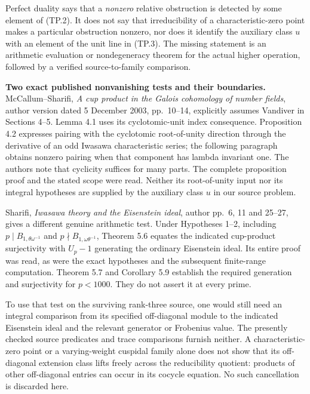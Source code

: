 \documentclass[11pt,a4paper]{article}
\theoremstyle{definition}
\renewcommand{\paragraph}[1]{\par\smallskip\noindent\textbf{#1}\quad\ignorespaces}
\begin{document}
Perfect duality says that a \emph{nonzero} relative
obstruction is detected by some element of (TP.2).
It does not say that irreducibility of a characteristic-zero
point makes a particular obstruction nonzero, nor does it
identify the auxiliary class \(u\) with an element of
the unit line in (TP.3).  The missing statement is an
arithmetic evaluation or nondegeneracy theorem for the
actual higher operation, followed by a verified
source-to-family comparison.

\paragraph{Two exact published nonvanishing tests and their boundaries.}
McCallum--Sharifi, \emph{A cup product in the Galois
cohomology of number fields}, author version dated
5 December 2003, pp.~10--14, explicitly assumes
Vandiver in Sections 4--5.  Lemma 4.1 uses its
cyclotomic-unit index consequence.  Proposition 4.2
expresses pairing with the cyclotomic root-of-unity
direction through the derivative of an odd Iwasawa
characteristic series; the following paragraph obtains
nonzero pairing when that component has lambda
invariant one.  The authors note that cyclicity suffices
for many parts.  The complete proposition proof and
the stated scope were read.  Neither its root-of-unity
input nor its integral hypotheses are supplied by
the auxiliary class \(u\) in our source problem.

Sharifi, \emph{Iwasawa theory and the Eisenstein ideal},
author pp.~6, 11 and 25--27, gives a different genuine
arithmetic test.  Under Hypotheses 1--2, including
\(p\mid B_{1,\theta\omega^{-1}}\) and
\(p\nmid B_{1,\omega\theta^{-1}}\), Theorem 5.6
equates the indicated cup-product surjectivity with
\(U_p-1\) generating the ordinary Eisenstein ideal.
Its entire proof was read, as were the exact
hypotheses and the subsequent finite-range computation.
Theorem 5.7 and Corollary 5.9 establish the required
generation and surjectivity for \(p<1000\).
They do not assert it at every prime.

To use that test on the surviving rank-three source,
one would still need an integral comparison from its
specified off-diagonal module to the indicated
Eisenstein ideal and the relevant generator or
Frobenius value.  The presently checked source
predicates and trace comparisons furnish neither.
A characteristic-zero point or a varying-weight
cuspidal family alone does not show that its
off-diagonal extension class lifts freely across
the reducibility quotient: products of other
off-diagonal entries can occur in its cocycle
equation.  No such cancellation is discarded here.
\end{document}
